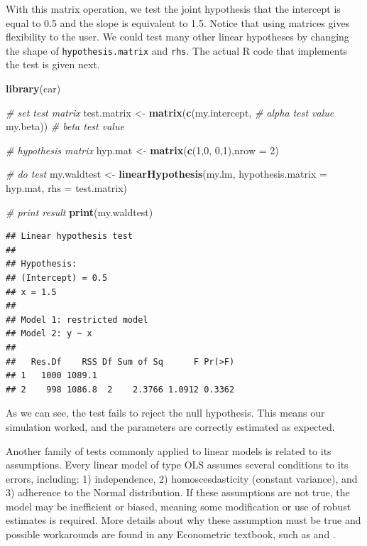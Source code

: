 \documentclass[11pt,]{book}
\newenvironment{Shaded}{\begin{snugshade}}{\end{snugshade}}
\newcommand{\KeywordTok}[1]{\textcolor[rgb]{0.27,0.27,0.27}{\textbf{#1}}}
\newcommand{\DataTypeTok}[1]{\textcolor[rgb]{0.27,0.27,0.27}{#1}}
\newcommand{\DecValTok}[1]{\textcolor[rgb]{0.06,0.06,0.06}{#1}}
\newcommand{\StringTok}[1]{\textcolor[rgb]{0.5,0.5,0.5}{#1}}
\newcommand{\CommentTok}[1]{\textcolor[rgb]{0.56,0.35,0.01}{\textit{#1}}}
\newcommand{\NormalTok}[1]{#1}
\begin{document}
With this matrix operation, we test the joint hypothesis that the
intercept is equal to 0.5 and the slope is equivalent to 1.5. Notice
that using matrices gives flexibility to the user. We could test many
other linear hypotheses by changing the shape of
\texttt{hypothesis.matrix} and \texttt{rhs}. The actual R code that
implements the test is given next.

\begin{Shaded}
\begin{Highlighting}[]
\KeywordTok{library}\NormalTok{(car)}

\CommentTok{# set test matrix}
\NormalTok{test.matrix <-}\StringTok{ }\KeywordTok{matrix}\NormalTok{(}\KeywordTok{c}\NormalTok{(my.intercept,  }\CommentTok{# alpha test value}
\NormalTok{                        my.beta))  }\CommentTok{# beta test value}

\CommentTok{# hypothesis matrix }
\NormalTok{hyp.mat <-}\StringTok{ }\KeywordTok{matrix}\NormalTok{(}\KeywordTok{c}\NormalTok{(}\DecValTok{1}\NormalTok{,}\DecValTok{0}\NormalTok{,}
                    \DecValTok{0}\NormalTok{,}\DecValTok{1}\NormalTok{),}\DataTypeTok{nrow =} \DecValTok{2}\NormalTok{)}

\CommentTok{# do test}
\NormalTok{my.waldtest <-}\StringTok{ }\KeywordTok{linearHypothesis}\NormalTok{(my.lm, }
                                \DataTypeTok{hypothesis.matrix =}\NormalTok{ hyp.mat, }
                                \DataTypeTok{rhs =}\NormalTok{ test.matrix)}

\CommentTok{# print result}
\KeywordTok{print}\NormalTok{(my.waldtest)}
\end{Highlighting}
\end{Shaded}

\begin{verbatim}
## Linear hypothesis test
## 
## Hypothesis:
## (Intercept) = 0.5
## x = 1.5
## 
## Model 1: restricted model
## Model 2: y ~ x
## 
##   Res.Df    RSS Df Sum of Sq      F Pr(>F)
## 1   1000 1089.1                           
## 2    998 1086.8  2    2.3766 1.0912 0.3362
\end{verbatim}

As we can see, the test fails to reject the null hypothesis. This means
our simulation worked, and the parameters are correctly estimated as
expected.

Another family of tests commonly applied to linear models is related to
its assumptions. Every linear model of type OLS assumes several
conditions to its errors, including: 1) independence, 2)
homoscesdasticity (constant variance), and 3) adherence to the Normal
distribution. If these assumptions are not true, the model may be
inefficient or biased, meaning some modification or use of robust
estimates is required. More details about why these assumption must be
true and possible workarounds are found in any Econometric textbook,
such as \citet{greene2003econometric} and
\citet{maddala2001introduction}.
\end{document}
